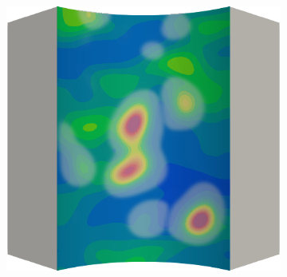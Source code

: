 \begin{figure}[!htbp]
\begin{subfigure}{0.19\textwidth}
  \end{subfigure}
  \hspace{0.06\textwidth}
  \begin{subfigure}{0.19\textwidth}
    \centering
    \includegraphics[width=\textwidth]{Chapter5/figures/spallation/ep.0015}
  \end{subfigure}
  

\end{figure}
